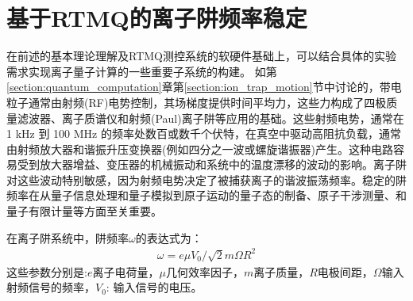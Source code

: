 \section[基于RTMQ的离子阱频率稳定]{基于RTMQ的离子阱频率稳定\label{section:trap_frequency_stablization}}

在前述的基本理论理解及RTMQ测控系统的软硬件基础上，可以结合具体的实验需求实现离子量子计算的一些重要子系统的构建。
如第\ref{section:quantum_computation}章第\ref{section:ion_trap_motion}节中讨论的，带电粒子通常由射频(RF)电势控制，其场梯度提供时间平均力，这些力构成了四极质量滤波器、离子质谱仪和射频(Paul)离子阱等应用的基础\cite[]{Dehmelt_1990, Paul_1990}。这些射频电势，通常在 1 kHz 到 100 MHz 的频率处数百或数千个伏特，在真空中驱动高阻抗负载，通常由射频放大器和谐振升压变换器(例如四分之一波或螺旋谐振器)产生\cite[]{Siverns_Simkins_Weidt_Hensinger_2012}。这种电路容易受到放大器增益、变压器的机械振动和系统中的温度漂移的波动的影响。离子阱对这些波动特别敏感，因为射频电势决定了被捕获离子的谐波振荡频率。稳定的阱频率在从量子信息处理\cite[]{Blatt_Wineland_2008, Monroe_Kim_2013}和量子模拟\cite[]{Richerme_Gong_Lee_Senko_Smith_Foss_Feig_Michalakis_Gorshkov_Monroe_2014, Jurcevic_Lanyon_Hauke_Hempel_Zoller_Blatt_Roos_2014}到原子运动的量子态的制备\cite[]{Leibfried_Blatt_Monroe_Wineland_2003}、原子干涉测量\cite[]{Johnson_Neyenhuis_Mizrahi_Wong_Campos_Monroe_2015}、和量子有限计量\cite[]{Chou_Hume_Koelemeij_Wineland_Rosenband_2010}等方面至关重要。


在离子阱系统中，阱频率$\omega$的表达式为：
\begin{align}
    \omega=e\mu V_0/\sqrt{2}m\Omega R^2 \label{eq:trap_frequency}
\end{align}
这些参数分别是:$e$离子电荷量，$\mu$几何效率因子，$m$离子质量，$R$电极间距，$\Omega$输入射频信号的频率，$V_0$: 输入信号的电压。


